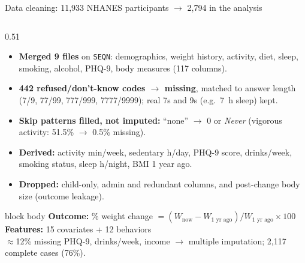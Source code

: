 \documentclass[aspectratio=169,10pt]{beamer}
\newcommand{\smallnote}[1]{{\scriptsize\color{quiet}#1}}
\begin{document}
\begin{frame}{Data cleaning: 11,933 NHANES participants $\rightarrow$ 2,794 in the analysis}
\begin{columns}[T,onlytextwidth]
\begin{column}{0.51\textwidth}
\footnotesize
\begin{itemize}\setlength{\itemsep}{2pt}
  \item \textbf{Merged 9 files} on \texttt{SEQN}: demographics, weight history,
        activity, diet, sleep, smoking, alcohol, PHQ-9, body measures (117 columns).
  \item \textbf{442 refused/don't-know codes $\rightarrow$ missing}, matched to answer
        length (7/9, 77/99, 777/999, 7777/9999); real 7s and 9s (e.g.\ 7~h sleep) kept.
  \item \textbf{Skip patterns filled, not imputed:} ``none'' $\rightarrow$ 0 or \emph{Never}
        (vigorous activity: 51.5\% $\rightarrow$ 0.5\% missing).
  \item \textbf{Derived:} activity min/week, sedentary h/day, PHQ-9 score,
        drinks/week, smoking status, sleep h/night, BMI 1 year ago.
  \item \textbf{Dropped:} child-only, admin and redundant columns, and
        post-change body size (outcome leakage).
\end{itemize}

\vspace{2pt}
\begin{beamercolorbox}[sep=4pt,rounded=true]{block body}
\footnotesize
\textbf{Outcome:} \% weight change $= (W_{\text{now}} - W_{\text{1 yr ago}}) / W_{\text{1 yr ago}} \times 100$\\[1pt]
\textbf{Features:} 15 covariates + 12 behaviors\\[1pt]
\smallnote{$\approx$12\% missing PHQ-9, drinks/week, income $\rightarrow$ multiple imputation; 2,117 complete cases (76\%).}
\end{beamercolorbox}
\end{column}

\end{columns}
\end{frame}
\end{document}
